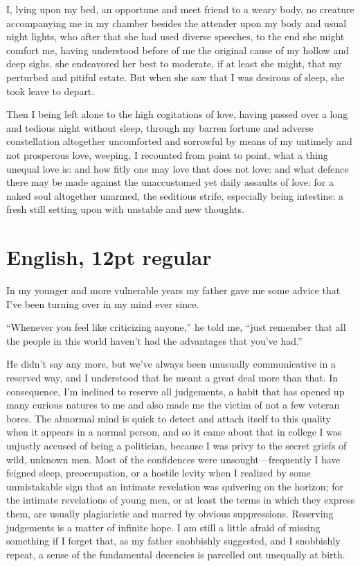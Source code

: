 \documentclass[12pt]{book}
\begin{document}
I, lying upon my bed, an opportune and meet friend to a weary body, no
creature accompanying me in my chamber besides the attender upon my
body and usual night lights, who after that she had used diverse
speeches, to the end she might comfort me, having understood before
of me the original cause of my hollow and deep sighs, she
endeavored her best to moderate, if at least she might, that my
perturbed and pitiful estate. But when she saw that I was desirous
of sleep, she took leave to depart.

Then I being left alone to the high cogitations of love, having passed
over a long and tedious night without sleep, through my barren
fortune and adverse constellation altogether uncomforted and
sorrowful by means of my untimely and not prosperous love, weeping,
I recounted from point to point, what a thing unequal love is: and
how fitly one may love that does not love: and what defence there may
be made against the unaccustomed yet daily assaults of love: for a
naked soul altogether unarmed, the seditious strife, especially being
intestine: a fresh still setting upon with unstable and new
thoughts.\pagebreak

\section*{English, 12pt regular}

In my younger and more vulnerable years my father gave me some advice
that I’ve been turning over in my mind ever since.

“Whenever you feel like criticizing anyone,” he told me, “just
remember that all the people in this world haven’t had the advantages
that you’ve had.”

He didn’t say any more, but we’ve always been unusually communicative
in a reserved way, and I understood that he meant a great deal more
than that. In consequence, I’m inclined to reserve all judgements, a
habit that has opened up many curious natures to me and also made me
the victim of not a few veteran bores. The abnormal mind is quick to
detect and attach itself to this quality when it appears in a normal
person, and so it came about that in college I was unjustly accused of
being a politician, because I was privy to the secret griefs of wild,
unknown men. Most of the confidences were unsought—frequently I have
feigned sleep, preoccupation, or a hostile levity when I realized by
some unmistakable sign that an intimate revelation was quivering on
the horizon; for the intimate revelations of young men, or at least
the terms in which they express them, are usually plagiaristic and
marred by obvious suppressions. Reserving judgements is a matter of
infinite hope. I am still a little afraid of missing something if I
forget that, as my father snobbishly suggested, and I snobbishly
repeat, a sense of the fundamental decencies is parcelled out
unequally at birth.
\end{document}
